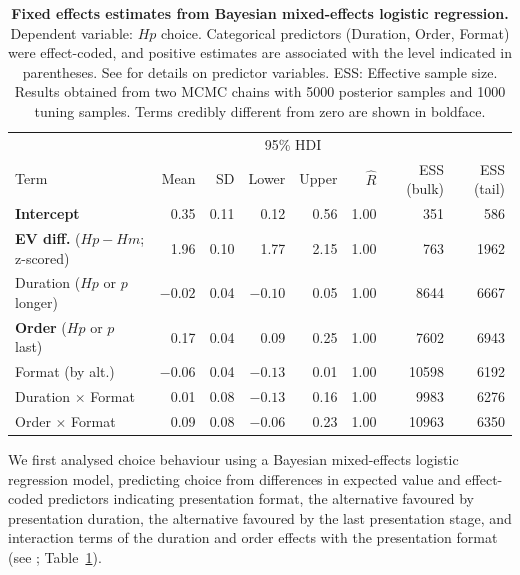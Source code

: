 \documentclass[11pt, a4paper, twocolumn, abstract]{scrartcl}
\begin{document}
\begin{table}[tb!]
	\centering
	{
		\begin{tabular}{lrrrrrrr}
			\toprule
			\multicolumn{1}{c}{} & \multicolumn{1}{c}{} & \multicolumn{1}{c}{} & \multicolumn{2}{c}{95\% HDI} & \multicolumn{1}{c}{} & \multicolumn{1}{c}{} & \multicolumn{1}{c}{} \\
			\cline{4-5}
			Term & Mean & SD & Lower & Upper & $\hat{R}$ & ESS (bulk) & ESS (tail)  \\
			\cmidrule[0.4pt]{1-8}
			\textbf{Intercept} & 0.35 & 0.11 & 0.12 & 0.56 & 1.00 & 351 & 586  \\
			\textbf{EV diff.} ($Hp - Hm$; z-scored) & 1.96 & 0.10 & 1.77 & 2.15 & 1.00 & 763 & 1962  \\
			Duration ($Hp$ or $p$ longer) & $-0.02$ & 0.04 & $-0.10$ & 0.05 & 1.00 & 8644 & 6667  \\
			\textbf{Order} ($Hp$ or $p$ last) & 0.17 & 0.04 & 0.09 & 0.25 & 1.00 & 7602 & 6943  \\
			Format (by alt.) & $-0.06$ & 0.04 & $-0.13$ & 0.01 & 1.00 & 10598 & 6192  \\
			Duration $\times$ Format & 0.01 & 0.08 & $-0.13$ & 0.16 & 1.00 & 9983 & 6276  \\
			Order $\times$ Format & 0.09 & 0.08 & $-0.06$ & 0.23 & 1.00 & 10963 & 6350  \\
			\bottomrule
		\end{tabular}
	}
	\caption{\textbf{Fixed effects estimates from Bayesian mixed-effects logistic regression.} Dependent variable: $Hp$ choice. Categorical predictors (Duration, Order, Format) were effect-coded, and positive estimates are associated with the level indicated in parentheses. See  for details on predictor variables. ESS: Effective sample size. Results obtained from two MCMC chains with 5000 posterior samples and 1000 tuning samples. Terms credibly different from zero are shown in boldface.}
	\label{tab:regression}
\end{table}

We first analysed choice behaviour using a Bayesian mixed-effects logistic regression model, predicting choice from differences in expected value and effect-coded predictors indicating presentation format, the alternative favoured by presentation duration, the alternative favoured by the last presentation stage, and interaction terms of the duration and order effects with the presentation format (see ; Table~\ref{tab:regression}).
\end{document}

